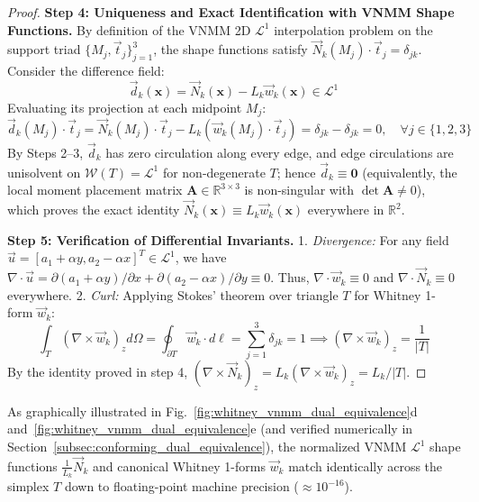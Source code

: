 \documentclass[preprint,12pt]{elsarticle}
\begin{document}
\begin{proof}
    \textbf{Step 4: Uniqueness and Exact Identification with VNMM Shape Functions.}
    By definition of the VNMM 2D $\mathcal{L}^1$ interpolation problem on the support triad $\{M_j, \vec{t}_j\}_{j=1}^3$, the shape functions satisfy $\vec{N}_k(M_j) \cdot \vec{t}_j = \delta_{jk}$. Consider the difference field:
    \begin{equation}
        \vec{d}_k(\mathbf{x}) = \vec{N}_k(\mathbf{x}) - L_k \vec{w}_k(\mathbf{x}) \in \mathcal{L}^1
    \end{equation}
    Evaluating its projection at each midpoint $M_j$:
    \begin{equation}
        \vec{d}_k(M_j) \cdot \vec{t}_j = \vec{N}_k(M_j) \cdot \vec{t}_j - L_k \left( \vec{w}_k(M_j) \cdot \vec{t}_j \right) = \delta_{jk} - \delta_{jk} = 0, \quad \forall j \in \{1, 2, 3\}
    \end{equation}
    By Steps 2--3, $\vec{d}_k$ has zero circulation along every edge, and edge circulations are unisolvent on $\mathcal{W}(T)=\mathcal{L}^1$ for non-degenerate $T$; hence $\vec{d}_k \equiv \mathbf{0}$ (equivalently, the local moment placement matrix $\mathbf{A} \in \mathbb{R}^{3 \times 3}$ is non-singular with $\det \mathbf{A} \neq 0$), which proves the exact identity $\vec{N}_k(\mathbf{x}) \equiv L_k \vec{w}_k(\mathbf{x})$ everywhere in $\mathbb{R}^2$.

    \textbf{Step 5: Verification of Differential Invariants.}
    1. \textit{Divergence:} For any field $\vec{u} = [a_1 + \alpha y, a_2 - \alpha x]^T \in \mathcal{L}^1$, we have $\nabla \cdot \vec{u} = \partial(a_1 + \alpha y)/\partial x + \partial(a_2 - \alpha x)/\partial y \equiv 0$. Thus, $\nabla \cdot \vec{w}_k \equiv 0$ and $\nabla \cdot \vec{N}_k \equiv 0$ everywhere.
    2. \textit{Curl:} Applying Stokes' theorem over triangle $T$ for Whitney 1-form $\vec{w}_k$:
    \begin{equation}
        \int_T (\nabla \times \vec{w}_k)_z d\Omega = \oint_{\partial T} \vec{w}_k \cdot d\boldsymbol{\ell} = \sum_{j=1}^3 \delta_{jk} = 1 \implies (\nabla \times \vec{w}_k)_z = \frac{1}{|T|}
    \end{equation}
    By the identity proved in step 4, $(\nabla \times \vec{N}_k)_z = L_k (\nabla \times \vec{w}_k)_z = L_k / |T|$.
\end{proof}

As graphically illustrated in Fig.~\ref{fig:whitney_vnmm_dual_equivalence}d and~\ref{fig:whitney_vnmm_dual_equivalence}e (and verified numerically in Section~\ref{subsec:conforming_dual_equivalence}), the normalized VNMM $\mathcal{L}^1$ shape functions $\frac{1}{L_k}\vec{N}_k$ and canonical Whitney 1-forms $\vec{w}_k$ match identically across the simplex $T$ down to floating-point machine precision ($\approx 10^{-16}$).
\end{document}

